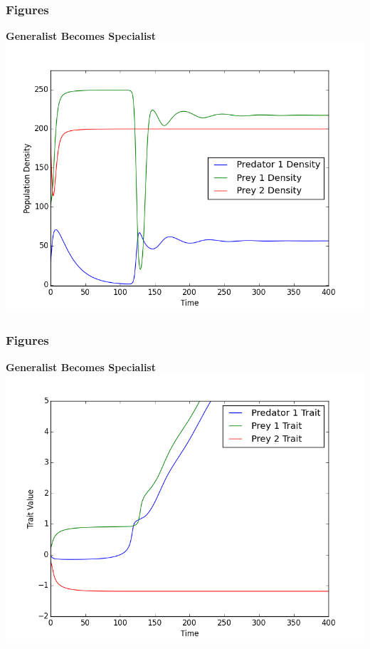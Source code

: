 \documentclass[10pt]{beamer}
\begin{document}
\begin{frame}
	\frametitle{Figures}
	{\bf Generalist Becomes Specialist}
	\includegraphics[scale=0.5]{figures/1x2/densities_generalist_to_specialist.png}
\end{frame}
\begin{frame}
	\frametitle{Figures}
	{\bf Generalist Becomes Specialist}
	\includegraphics[scale=0.5]{figures/1x2/traits_generalist_to_specialist.png}
\end{frame}
\end{document}
